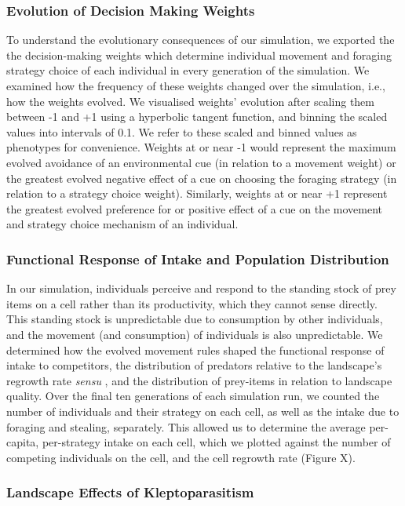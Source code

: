 \documentclass[11pt]{article}
\begin{document}
\subsubsection{Evolution of Decision Making Weights}

To understand the evolutionary consequences of our simulation, we exported the the decision-making weights which determine individual movement and foraging strategy choice of each individual in every generation of the simulation.
We examined how the frequency of these weights changed over the simulation, i.e., how the weights evolved.
We visualised weights' evolution after scaling them between -1 and +1 using a hyperbolic tangent function, and binning the scaled values into intervals of 0.1.
We refer to these scaled and binned values as phenotypes for convenience.
Weights at or near -1 would represent the maximum evolved avoidance of an environmental cue (in relation to a movement weight) or the greatest evolved negative effect of a cue on choosing the foraging strategy (in relation to a strategy choice weight).
Similarly, weights at or near +1 represent the greatest evolved preference for or positive effect of a cue on the movement and strategy choice mechanism of an individual.

\subsubsection{Functional Response of Intake and Population Distribution}

In our simulation, individuals perceive and respond to the standing stock of prey items on a cell rather than its productivity, which they cannot sense directly.
This standing stock is unpredictable due to consumption by other individuals, and the movement (and consumption) of individuals is also unpredictable.
We determined how the evolved movement rules shaped the functional response of intake to competitors, the distribution of predators relative to the landscape's regrowth rate \textit{sensu} \citet{meer1997}, and the distribution of prey-items in relation to landscape quality.
Over the final ten generations of each simulation run, we counted the number of individuals and their strategy on each cell, as well as the intake due to foraging and stealing, separately.
This allowed us to determine the average per-capita, per-strategy intake on each cell, which we plotted against the number of competing individuals on the cell, and the cell regrowth rate (Figure X).

\subsubsection{Landscape Effects of Kleptoparasitism}
\end{document}
